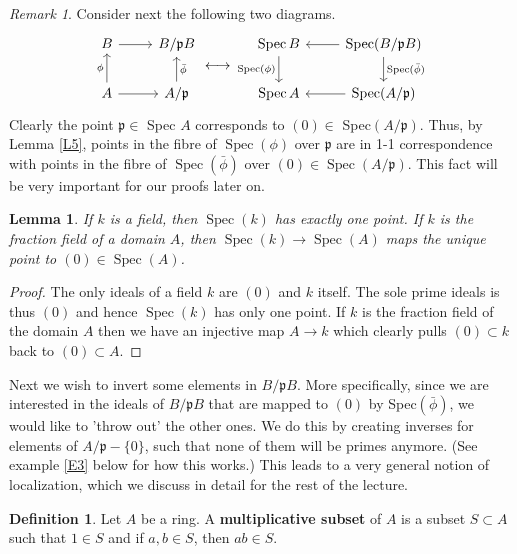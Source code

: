 \documentclass{article}
\newcommand{\fr}{\mathfrak}
\DeclareMathOperator{\Spec}{Spec}
\theoremstyle{plain}
\newtheorem{lem}[thm]{Lemma}
\theoremstyle{definition}
\newtheorem{defn}{Definition}
\theoremstyle{remark}
\newtheorem*{rem}{Remark}
\begin{document}
\begin{rem}
Consider next the following two diagrams. 
\[
\begin{tikzcd}
B\arrow{r} & B/\fr pB\\
A\arrow{u}{\phi}\arrow{r} & A/\fr p\arrow[swap]{u}{\bar\phi}
\end{tikzcd}
\longleftrightarrow
\begin{tikzcd}
\Spec B\arrow[swap]{d}{\Spec(\phi)} & \arrow{l}\arrow{d}{\Spec(\bar\phi)}\Spec(B/\fr pB)\\
\Spec A & \arrow{l}\Spec(A/\fr p)
\end{tikzcd}
\]
Clearly the point $\fr p \in$ Spec $A$ corresponds to $(0) \in$ Spec$(A/\fr p)$. Thus, by Lemma \ref{L5}, points in the fibre of $\Spec(\phi)$ over $\fr p$ are in 1-1 correspondence with points in the fibre of $\Spec(\bar \phi)$ over $(0)\in\Spec(A/\fr p)$. This fact will be very important for our proofs later on.
\end{rem}

\begin{lem}
\label{L6}
    If $k$ is a field, then $\Spec(k)$ has exactly one point. If $k$ is the fraction field of a domain $A$, then $\Spec(k)\to\Spec(A)$
    maps the unique point to $(0)\in\Spec(A)$.
\end{lem}
\begin{proof}
    The only ideals of a field $k$ are $(0)$ and $k$ itself. The sole prime ideals is thus $(0)$ and hence $\Spec(k)$ has only one point.
    If $k$ is the fraction field of the domain $A$ then we have an injective map $A\to k$ which clearly pulls $(0)\subset k$ back to $(0)\subset A$. 
\end{proof}

Next we wish to invert some elements in $B/\fr p B$. More specifically, since we are interested in the ideals of $B/\fr p B$ that are mapped to $(0)$ by Spec$(\bar \phi)$, we would like to 'throw out' the other ones. We do this by creating inverses for elements of $A/\fr p - \{0\}$, such that none of them will be primes anymore. (See example \ref{E3} below for how this works.) This leads to a very general notion of localization, which we discuss in detail for the rest of the lecture.

\begin{defn}
    Let $A$ be a ring. A \textbf{multiplicative subset} of $A$ is a subset $S\subset A$ such that $1\in S$ and if $a,b\in S$,
    then $ab\in S$.
\end{defn}
\end{document}

